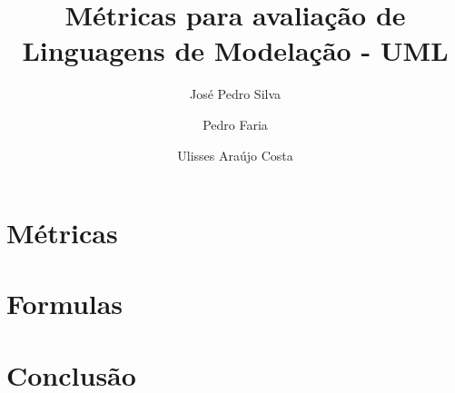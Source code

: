 \documentclass[10pt]{article}
\title{\sf  Métricas para avaliação de Linguagens de Modelação - UML}
\author{ José Pedro Silva \and Pedro Faria \and Ulisses Araújo Costa }
\date{}
\begin{document}
\maketitle

\section{Métricas}

\section{Formulas}


\section{Conclusão}

{}

\end{document}
